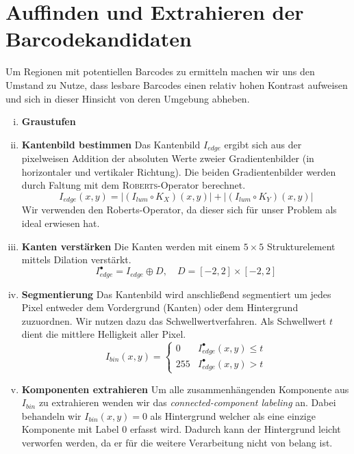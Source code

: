 \chapter{Auffinden und Extrahieren der Barcodekandidaten}
\writtenby{\dcauthornameewie}%
Um Regionen mit potentiellen Barcodes zu ermitteln machen wir uns den Umstand zu Nutze, dass lesbare Barcodes einen relativ hohen Kontrast aufweisen und sich in dieser Hinsicht von deren Umgebung abheben.

\begin{enumerate}[(i)]
\item \textbf{Graustufen}

\item \textbf{Kantenbild bestimmen} Das Kantenbild $I_{edge}$ ergibt sich aus der pixelweisen Addition der absoluten Werte zweier Gradientenbilder (in horizontaler und vertikaler Richtung). 
Die beiden Gradientenbilder werden durch Faltung mit dem \textsc{Roberts}-Operator berechnet.
  \[ I_{edge}(x,y) = \big|(I_{lum} \circ K_X)(x,y)\big| + \big|(I_{lum} \circ K_Y)(x,y)\big| \]
Wir verwenden den Roberts-Operator, da dieser sich für unser Problem als ideal erwiesen hat.

\item \textbf{Kanten verstärken} Die Kanten werden mit einem $5\times5$ Strukturelement mittels Dilation verstärkt.
    \[ I_{edge}^\bullet = I_{edge} \oplus D, \quad D = [-2,2]\times[-2,2] \]

\item \textbf{Segmentierung} Das Kantenbild wird anschließend segmentiert um jedes Pixel entweder dem Vordergrund (Kanten) oder dem Hintergrund zuzuordnen.
Wir nutzen dazu das Schwellwertverfahren.
Als Schwellwert \( t \) dient die mittlere Helligkeit aller Pixel.
  \[ I_{bin}(x,y) = \begin{cases}
       0   & I_{edge}^\bullet(x,y) \leq t \\
       255 & I_{edge}^\bullet(x,y) > t
     \end{cases} \]

\item \textbf{Komponenten extrahieren} Um alle zusammenhängenden Komponente aus $I_{bin}$ zu extrahieren wenden wir das \textit{connected-component labeling} an.
Dabei behandeln wir $I_{bin}(x,y) = 0$ als Hintergrund welcher als eine einzige Komponente mit Label $0$ erfasst wird.
Dadurch kann der Hintergrund leicht verworfen werden, da er für die weitere Verarbeitung nicht von belang ist.


\end{enumerate}
